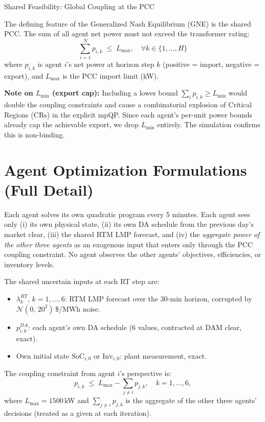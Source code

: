 \documentclass[11pt, letterpaper]{article}
\begin{document}
\begin{answerbox}{Shared Feasibility: Global Coupling at the PCC}

The defining feature of the Generalized Nash Equilibrium (GNE) is the shared PCC. The sum of all agent net power must not exceed the transformer rating:
\[
  \sum_{i=1}^N p_{i,k} \;\le\; L_{\max}, \quad \forall k \in \{1, \ldots, H\}
\]
where $p_{i,k}$ is agent $i$'s net power at horizon step $k$ (positive = import, negative = export), and $L_{\max}$ is the PCC import limit (kW).

\textbf{Note on $L_{\min}$ (export cap):} Including a lower bound $\sum_i p_{i,k} \ge L_{\min}$ would double the coupling constraints and cause a combinatorial explosion of Critical Regions (CRs) in the explicit mpQP. Since each agent's per-unit power bounds already cap the achievable export, we drop $L_{\min}$ entirely. The simulation confirms this is non-binding.

\end{answerbox}

\section{Agent Optimization Formulations (Full Detail)}

Each agent solves its own quadratic program every 5 minutes.  Each agent sees only
(i) its own physical state, (ii) its own DA schedule from the previous day's market
clear, (iii) the shared RTM LMP forecast, and (iv) the \emph{aggregate power of the
other three agents} as an exogenous input that enters only through the PCC coupling
constraint.  No agent observes the other agents' objectives, efficiencies, or
inventory levels.

The shared uncertain inputs at each RT step are:
\begin{itemize}[nosep]
  \item $\lambda^{RT}_k$, $k=1,\ldots,6$: RTM LMP forecast over the 30-min horizon,
        corrupted by $\mathcal{N}(0,\,20^2)$\,\$/MWh noise.
  \item $p^{DA}_{i,k}$: each agent's own DA schedule (6 values, contracted at DAM clear, exact).
  \item Own initial state $\text{SoC}_{i,0}$ or $\text{Inv}_{i,0}$: plant measurement, exact.
\end{itemize}

The coupling constraint from agent $i$'s perspective is:
\[
  p_{i,k} \;\le\; L_{\max} - \textstyle\sum_{j \ne i} p_{j,k}, \quad k = 1,\ldots,6,
\]
where $L_{\max} = 1500$\,kW and $\sum_{j \ne i} p_{j,k}$ is the aggregate of the other three agents' decisions (treated as a given at each iteration).
\end{document}
